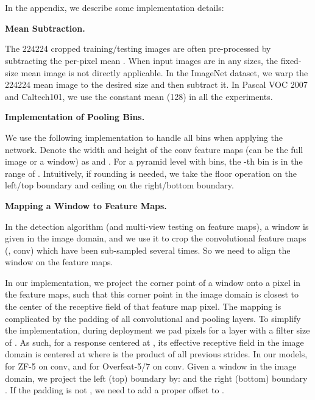 \documentclass[10pt,journal,cspaper,compsoc]{IEEEtran}
\begin{document}
\appendices
\section{}
In the appendix, we describe some implementation details:

\vspace{6pt}
\noindent\textbf{Mean Subtraction.}

The 224224 cropped training/testing images are often pre-processed by subtracting the per-pixel mean \cite{Krizhevsky2012}. When input images are in any sizes, the fixed-size mean image is not directly applicable. In the ImageNet dataset, we warp the 224224 mean image to the desired size and then subtract it.
In Pascal VOC 2007 and Caltech101, we use the constant mean (128) in all the experiments.

\vspace{6pt}
\noindent\textbf{Implementation of Pooling Bins.}

We use the following implementation to handle all bins when applying the network. Denote the width and height of the conv feature maps (can be the full image or a window) as  and . For a pyramid level with  bins, the -th bin is in the range of . Intuitively, if rounding is needed, we take the floor operation on the left/top boundary and ceiling on the right/bottom boundary.

\vspace{6pt}
\noindent\textbf{Mapping a Window to Feature Maps.}

In the detection algorithm (and multi-view testing on feature maps), a window is given in the image domain, and we use it to crop the convolutional feature maps (\eg, conv) which have been sub-sampled several times. So we need to align the window on the feature maps.

In our implementation, we project the corner point of a window onto a pixel in the feature maps, such that this corner point in the image domain is closest to the center of the receptive field of that feature map pixel.
The mapping is complicated by the padding of all convolutional and pooling layers. To simplify the implementation, during deployment we pad  pixels for a layer with a filter size of . As such, for a response centered at  , its effective receptive field in the image domain is centered at  where  is the product of all previous strides. In our models,  for ZF-5 on conv, and  for Overfeat-5/7 on conv. Given a window in the image domain, we project the left (top) boundary by:  and the right (bottom) boundary .
If the padding is not , we need to add a proper offset to .
\end{document}
